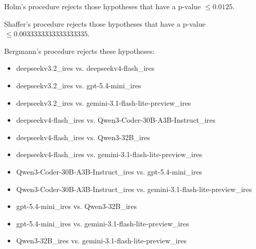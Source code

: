 \documentclass[a4paper,10pt]{article}
\begin{document}
\begin{landscape}
Holm's procedure rejects those hypotheses that have a p-value $\le0.0125$.


Shaffer's procedure rejects those hypotheses that have a p-value $\le0.0033333333333333335$.


Bergmann's procedure rejects these hypotheses:


\begin{itemize}


\item deepseekv3.2_ires vs. deepseekv4-flash_ires\item deepseekv3.2_ires vs. gpt-5.4-mini_ires\item deepseekv3.2_ires vs. gemini-3.1-flash-lite-preview_ires\item deepseekv4-flash_ires vs. Qwen3-Coder-30B-A3B-Instruct_ires\item deepseekv4-flash_ires vs. Qwen3-32B_ires\item deepseekv4-flash_ires vs. gemini-3.1-flash-lite-preview_ires\item Qwen3-Coder-30B-A3B-Instruct_ires vs. gpt-5.4-mini_ires\item Qwen3-Coder-30B-A3B-Instruct_ires vs. gemini-3.1-flash-lite-preview_ires\item gpt-5.4-mini_ires vs. Qwen3-32B_ires\item gpt-5.4-mini_ires vs. gemini-3.1-flash-lite-preview_ires\item Qwen3-32B_ires vs. gemini-3.1-flash-lite-preview_ires\end{itemize}



\end{landscape}
\end{document}
